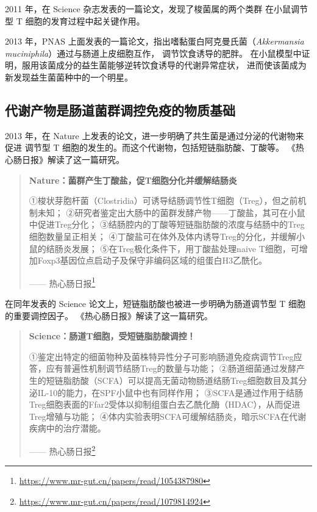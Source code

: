 \documentclass[]{ctexbook}
\renewcommand{\href}[2]{#2\footnote{\url{#1}}}
\begin{document}
2011 年，在 Science 杂志发表的一篇论文，发现了梭菌属的两个类群
在小鼠调节型 T 细胞的发育过程中起关键作用\citep{atarashiInductionColonicRegulatory2011}。

2013 年，PNAS 上面发表的一篇论文，指出嗜黏蛋白阿克曼氏菌（\emph{Akkermansia muciniphila}）通过与肠道上皮细胞互作，
调节饮食诱导的肥胖\citep{everardCrosstalkAkkermansiaMuciniphila2013}。
在小鼠模型中证明，服用该菌成分的益生菌能够逆转饮食诱导的代谢异常症状，
进而使该菌成为新发现益生菌菌种中的一个明星。

\hypertarget{ux4ee3ux8c22ux4ea7ux7269ux662fux80a0ux9053ux83ccux7fa4ux8c03ux63a7ux514dux75abux7684ux7269ux8d28ux57faux7840}{%
\subsection{代谢产物是肠道菌群调控免疫的物质基础}\label{ux4ee3ux8c22ux4ea7ux7269ux662fux80a0ux9053ux83ccux7fa4ux8c03ux63a7ux514dux75abux7684ux7269ux8d28ux57faux7840}}

2013 年，在 Nature 上发表的论文，进一步明确了共生菌是通过分泌的代谢物来促进
调节型 T 细胞的发生的。而这个代谢物，包括短链脂肪酸、丁酸等\citep{arpaiaMetabolitesProducedCommensal2013}。
《热心肠日报》解读了这一篇研究。

\begin{quote}
\textbf{Nature：菌群产生丁酸盐，促T细胞分化并缓解结肠炎}

①梭状芽胞杆菌（Clostridia）可诱导结肠调节性T细胞（Treg），但之前机制未知；
②研究者鉴定出大肠中的菌群发酵产物------丁酸盐，其可在小鼠中促进Treg分化；
③结肠腔内的丁酸等短链脂肪酸的浓度与结肠中的Treg细胞数量呈正相关；
④丁酸盐可在体外及体内诱导Treg的分化，并缓解小鼠的结肠炎发展；
⑤在Treg极化条件下，用丁酸盐处理naive T细胞，可增加Foxp3基因位点启动子及保守非编码区域的组蛋白H3乙酰化。

\begin{flushright}------ \href{https://www.mr-gut.cn/papers/read/1054387980}{热心肠日报}\end{flushright}
\end{quote}

在同年发表的 Science 论文上，短链脂肪酸也被进一步明确为肠道调节型 T 细胞的重要调控因子\citep{smithMicrobialMetabolitesShortChain2013}。
《热心肠日报》解读了这一篇研究。

\begin{quote}
\textbf{Science：肠道T细胞，受短链脂肪酸调控！}

①鉴定出特定的细菌物种及菌株特异性分子可影响肠道免疫病调节Treg应答，应有普遍性机制调节结肠Treg的数量与功能；
②肠道细菌通过发酵产生的短链脂肪酸（SCFA）可以提高无菌动物肠道结肠Treg细胞数目及其分泌IL-10的能力，在SPF小鼠中也有同样作用；
③SCFA是通过作用于结肠Treg细胞表面的Ffar2受体以抑制组蛋白去乙酰化酶（HDAC），从而促进Treg增殖与功能；
④体内实验表明SCFA可缓解结肠炎，暗示SCFA在代谢疾病中的治疗潜能。

\begin{flushright}------ \href{https://www.mr-gut.cn/papers/read/1079814924}{热心肠日报}\end{flushright}
\end{quote}
\end{document}

